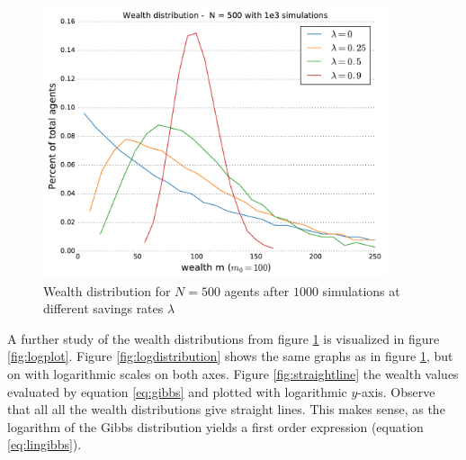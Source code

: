 \documentclass[10pt, a4paper]{amsart}
\begin{document}
\begin{figure}
	\centering
	\includegraphics[width=0.9\textwidth]{../figures/5ac/5c_N500_varSavings.pdf}
	\caption{Wealth distribution for $N=500$ agents after $1000$ simulations at different savings rates $\lambda$}
	\label{fig:distribution}
\end{figure}

A further study of the wealth distributions from figure \ref{fig:distribution} is visualized in figure \ref{fig:logplot}. Figure  \ref{fig:logdistribution} shows the same graphs as in figure \ref{fig:distribution}, but on with logarithmic scales on both axes. Figure \ref{fig:straightline} the wealth values evaluated by equation \ref{eq:gibbs} and plotted with logarithmic $y$-axis. Observe that all all the wealth distributions give straight lines. This makes sense, as the logarithm of the Gibbs distribution yields a first order expression (equation \ref{eq:lingibbs}).
\end{document}
